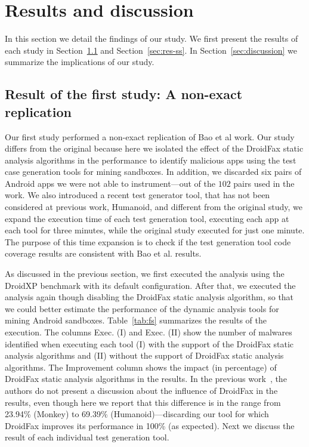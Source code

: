 \section{Results and discussion}

In this section we detail the findings of our study. We first present the results of each study
in Section~\ref{sec:res-fs} and Section~\ref{sec:res-ss}. In Section~\ref{sec:discussion} we summarize the
implications of our study. 

\subsection{Result of the first study: A non-exact replication}\label{sec:res-fs}

Our first study performed a non-exact replication of Bao et al work.
Our study differs from the original because here we isolated the effect
of the DroidFax static analysis algorithms in the performance to
identify malicious apps using the test case generation tools for
mining sandboxes. In addition, we discarded six pairs of
Android apps we were not able to instrument---out of the $102$ pairs used in the \original work.
 {\color{red}We also introduced a recent test generator tool, that has not been considered at previous work, Humanoid, and different from the original study, we expand the execution time of each test generation tool, executing each app at each tool for three minutes, while the original study executed for just one minute. The purpose of this time expansion is to check if the test generation tool code coverage results are consistent with Bao et al. results.}

As discussed in the previous section, we first executed the analysis using the DroidXP benchmark with its default configuration. After that, we executed the analysis again though disabling the DroidFax static analysis algorithm, so that we could better estimate the performance of the dynamic analysis tools for mining Android sandboxes. Table~\ref{tab:fs} summarizes the results of the execution. The columns Exec. (I) and Exec. (II) 
show the number of malwares identified when executing each tool (I) with the
support of the DroidFax static analysis algorithms and (II) without the support
of DroidFax static analysis algorithms. The Improvement column shows the impact
(in percentage) of DroidFax static analysis algorithms in the results.
In the previous work~\cite{}, the authors do not present a
discussion about the influence of DroidFax in the results, even
though here we report that this difference is in the
range from 23.94\% (Monkey) to 69.39\% (Humanoid)---discarding our
\joke tool for which DroidFax improves its performance in 100\% (as expected).
Next we discuss the result of each individual test generation tool. 

